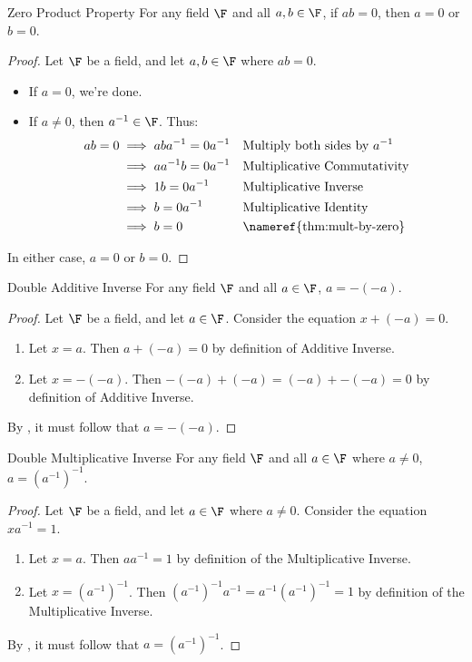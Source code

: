 \documentclass[letterpaper,12pt]{report}
\begin{document}
\begin{thmbox}{Zero Product Property}{}
	For any field $\F$ and all $a, b \in \F$, if $ab = 0$, then $a = 0$ or $b = 0$.
	\tcblower
	\begin{proof}
		Let $\F$ be a field, and let $a, b \in \F$ where $ab = 0$.
		\begin{itemize}
			\item If $a = 0$, we're done.
			\item If $a \neq 0$, then $a^{-1} \in \F$. Thus:
			\begin{align*}
				ab = 0  &\implies aba^{-1} = 0a^{-1} && \text{Multiply both sides by}\ a^{-1} \\
				&\implies aa^{-1}b = 0a^{-1} && \text{Multiplicative Commutativity} \\
				&\implies 1b = 0a^{-1} && \text{Multiplicative Inverse} \\
				&\implies b = 0a^{-1} && \text{Multiplicative Identity} \\
				&\implies b = 0 && \text{\nameref{thm:mult-by-zero}}
			\end{align*}
		\end{itemize}
		In either case, $a = 0$ or $b = 0$.
	\end{proof}
\end{thmbox}

\begin{thmbox}{Double Additive Inverse}{}
	For any field $\F$ and all $a \in \F$, $a = -(-a)$.
	\tcblower
	\begin{proof}
		Let $\F$ be a field, and let $a \in \F$. Consider the equation $x + (-a) = 0$.
		\begin{enumerate}
			\item Let $x = a$. Then $a + (-a) = 0$ by definition of Additive Inverse.
			\item Let $x = -(-a)$. Then $-(-a) + (-a) = (-a) + -(-a) = 0$ by definition of Additive Inverse.
		\end{enumerate}
		By , it must follow that $a = -(-a)$.
	\end{proof}
\end{thmbox}

\begin{thmbox}{Double Multiplicative Inverse}{}
	For any field $\F$ and all $a \in \F$ where $a \neq 0$, $a = (a^{-1})^{-1}$.
	\tcblower
	\begin{proof}
		Let $\F$ be a field, and let $a \in \F$ where $a \neq 0$. Consider the equation $x a^{-1} = 1$.
		\begin{enumerate}
			\item Let $x = a$. Then $a a^{-1} = 1$ by definition of the Multiplicative Inverse.
			\item Let $x = (a^{-1})^{-1}$. Then $(a^{-1})^{-1} a^{-1} = a^{-1} (a^{-1})^{-1} = 1$ by definition of the Multiplicative Inverse.
		\end{enumerate}
		By , it must follow that $a = (a^{-1})^{-1}$.
	\end{proof}
\end{thmbox}
\end{document}
